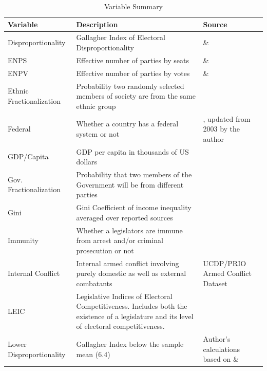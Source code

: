 \documentclass[a4paper]{article}\usepackage[]{graphicx}\usepackage[]{color}
\begin{document}


\begin{table}[!h]
    \small
    \begin{center}
    \caption{Variable Summary}
    \label{var_summary}
    \begin{tabular}{l m{7cm} m{3.5cm}}

            \hline
            Variable & Description & Source \\
            \hline \hline
            Disproportionality & Gallagher Index of Electoral Disproportionality & \cite{Gallagher2012} \& \cite{Carey2011} \\
            ENPS & Effective number of parties by seats & \cite{Gallagher2012} \& \cite{Carey2011} \\
            ENPV & Effective number of parties by votes & \cite{Gallagher2012} \& \cite{Carey2011} \\
            Ethnic Fractionalization & Probability two randomly selected members of society are from the same ethnic group & \cite{Alesina2003} \\
            Federal & Whether a country has a federal system or not & \cite{Carey2011}, updated from 2003 by the author \\
            GDP/Capita & GDP per capita in thousands of US dollars & \cite{WorldBank2011} \\
            Gov. Fractionalization & Probability that two members of the Government will be from different parties & \cite{DPI2001} \\
            Gini & Gini Coefficient of income inequality averaged over reported sources & \cite{UNU2008} \\
            Immunity & Whether a legislators are immune from arrest and/or criminal prosecution or not & \cite{Fish2009} \\
            Internal Conflict & Internal armed conflict involving purely domestic as well as external combatants & UCDP/PRIO Armed Conflict Dataset \citep{Themner2014} \\
            LEIC & Legislative Indices of Electoral Competitiveness. Includes both the existence of a legislature and its level of electoral competitiveness. & \cite{DPI2001} \\
            Lower Disproportionality & Gallagher Index below the sample mean (6.4) & Author's calculations based on \cite{Gallagher2012} \& \cite{Carey2011}\\

\end{tabular}
\end{center}
\end{table}
\end{document}
